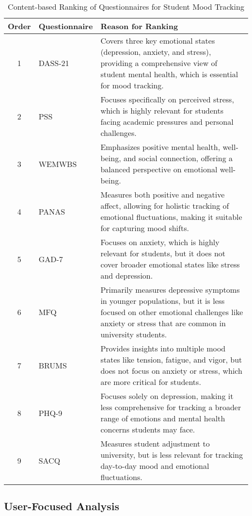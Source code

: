 \FloatBarrier
\begin{table}[ht]
\centering
\begin{tabular}{|c|p{3cm}|p{9cm}|}
\hline
\textbf{Order} & \textbf{Questionnaire} & \textbf{Reason for Ranking} \\ \hline
1 & DASS-21 & Covers three key emotional states (depression, anxiety, and stress), providing a comprehensive view of student mental health, which is essential for mood tracking. \\ \hline
2 & PSS & Focuses specifically on perceived stress, which is highly relevant for students facing academic pressures and personal challenges. \\ \hline
3 & WEMWBS & Emphasizes positive mental health, well-being, and social connection, offering a balanced perspective on emotional well-being. \\ \hline
4 & PANAS & Measures both positive and negative affect, allowing for holistic tracking of emotional fluctuations, making it suitable for capturing mood shifts. \\ \hline
5 & GAD-7 & Focuses on anxiety, which is highly relevant for students, but it does not cover broader emotional states like stress and depression. \\ \hline
6 & MFQ & Primarily measures depressive symptoms in younger populations, but it is less focused on other emotional challenges like anxiety or stress that are common in university students. \\ \hline
7 & BRUMS & Provides insights into multiple mood states like tension, fatigue, and vigor, but does not focus on anxiety or stress, which are more critical for students. \\ \hline
8 & PHQ-9 & Focuses solely on depression, making it less comprehensive for tracking a broader range of emotions and mental health concerns students may face. \\ \hline
9 & SACQ & Measures student adjustment to university, but is less relevant for tracking day-to-day mood and emotional fluctuations. \\ \hline
\end{tabular}
\caption{Content-based Ranking of Questionnaires for Student Mood Tracking}
\label{tab:questionnaire_content_based_ranking}
\end{table}
\FloatBarrier

\subsection{User-Focused Analysis}

